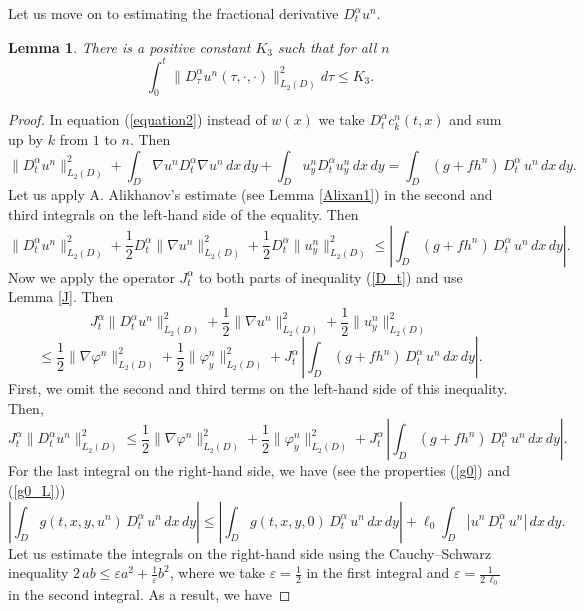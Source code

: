 \documentclass[12pt]{amsart}
\newtheorem{lem}[thm]{Lemma}
\theoremstyle{definition}
\numberwithin{equation}{section}
\begin{document}
Let us move on to estimating the fractional derivative $D_t^\alpha u^n$.
\begin{lem}\label{DunMain} There is a positive constant $K_3$ such that for all $n$
\begin{equation}\label{Destimate}
  \int_0^t\| D_\tau^{\alpha} u^n (\tau, \cdot, \cdot)\|^2_{L_2(D)}d \tau
    \leq K_3.  
\end{equation}
\end{lem}
\begin{proof}
In equation (\ref{equation2}) instead of $w(x)$ we take $D_t^\alpha c_k^n(t, x)$ and sum up by $k$ from $1$ to $n$. Then
\[
\| D_t^\alpha u^n \|_{L_2(D)}^2 + \int_D \nabla u^n D_t^\alpha \nabla u^n \, dx\, dy +  \int_D u_y^n D_t^\alpha u_y^n \, dx\, dy = \int_D (g + f h^n)\, D_t^\alpha\, u^n\, dx\, dy.
\]
Let us apply A. Alikhanov's estimate (see Lemma \ref{Alixan1}) in the second and third integrals on the left-hand side of the equality. Then
\begin{equation}\label{D_t}
\| D_t^{\alpha} u^n \|^2_{L_2(D)} + \frac{1}{2} D_t^{\alpha} \| \nabla u^n \|^2_{L_2(D)} +  \frac{1}{2} D_t^{\alpha} \| u_y^n \|^2_{L_2(D)} \leq \left| \int_D (g + f h^n)\, D_t^\alpha\, u^n\, dx\, dy\right |. 
\end{equation}
Now we apply the operator $J_t^\alpha$ to both parts of inequality (\ref{D_t}) and use Lemma \ref{J}. Then
\[
J_t^\alpha\| D_t^{\alpha} u^n \|^2_{L_2(D)}+ \frac{1}{2} \| \nabla u^n \|^2_{L_2(D)} +  \frac{1}{2} \| u_y^n \|^2_{L_2(D)}
\]
\[
\leq \frac{1}{2} \| \nabla \varphi^n \|^2_{L_2(D)} + \frac{1}{2} \| \varphi_y^n \|^2_{L_2(D)}+J_t^\alpha\, \left| \int_D (g + f h^n)\, D_t^\alpha\, u^n\, dx\, dy\right |.
\]
First, we omit the second and third terms on the left-hand side of this inequality. Then, 
\begin{equation}\label{JD}
J_t^\alpha\| D_t^{\alpha} u^n \|^2_{L_2(D)}\leq \frac{1}{2} \| \nabla \varphi^n \|^2_{L_2(D)} + \frac{1}{2} \| \varphi_y^n \|^2_{L_2(D)}+J_t^\alpha\, \left| \int_D (g + f h^n)\, D_t^\alpha\, u^n\, dx\, dy\right |.
\end{equation}
For the last integral on the right-hand side, we have (see the properties  (\ref{g0}) and (\ref{g0_L}))
\[
\left|\int_D g(t,x,y, u^n)\, D_t^\alpha\, u^n\, dx\, dy\right|  \leq \left|\int_D g(t,x,y, 0)\, D_t^\alpha\, u^n\, dx\, dy\right|+ \ell_0\int_D |u^n\, D_t^\alpha\, u^n|\, dx\, dy.
\]
Let us estimate the integrals on the right-hand side using the Cauchy–Schwarz inequality $2\, ab \leq \varepsilon a^2 + \frac{1}{\varepsilon} b^2$, where we take $\varepsilon=\frac{1}{2}$ in the first integral and $\varepsilon=\frac{1}{2\, \ell_0}$ in the second integral. As a result, we have

\end{proof}
\end{document}
